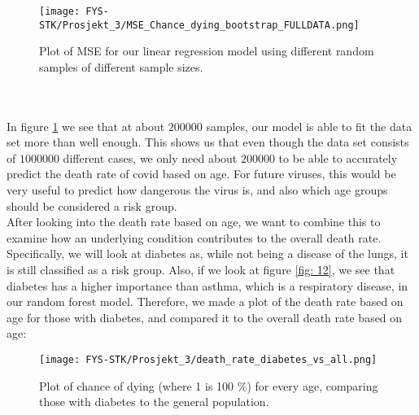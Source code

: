 \documentclass[english,notitlepage,reprint,nofootinbib]{revtex4-1}  %
\begin{document}
\begin{figure}[H]
    \centering
    \texttt{[image: FYS-STK/Prosjekt\_3/MSE\_Chance\_dying\_bootstrap\_FULLDATA.png]}
    \caption{Plot of MSE for our linear regression model using different random samples of different sample sizes.}
    \label{fig: 16}
\end{figure}
\\
\\
In figure \ref{fig: 16} we see that at about $200 000$ samples, our model is able to fit the data set more than well enough. This shows us that even though the data set consists of $1 000 000$ different cases, we only need about $200 000$ to be able to accurately predict the death rate of covid based on age. For future viruses, this would be very useful to predict how dangerous the virus is, and also which age groups should be considered a risk group.
\\
After looking into the death rate based on age, we want to combine this to examine how an underlying condition contributes to the overall death rate. Specifically, we will look at diabetes as, while not being a disease of the lungs, it is still classified as a risk group. Also, if we look at figure \ref{fig: 12}, we see that diabetes has a higher importance than asthma, which is a respiratory disease, in our random forest model. Therefore, we made a plot of the death rate based on age for those with diabetes, and compared it to the overall death rate based on age:
\begin{figure}[H]
    \centering
    \texttt{[image: FYS-STK/Prosjekt\_3/death\_rate\_diabetes\_vs\_all.png]}
    \caption{Plot of chance of dying (where 1 is 100 \%) for every age, comparing those with diabetes to the general population.}
    \label{fig: 17}
\end{figure}
\end{document}
